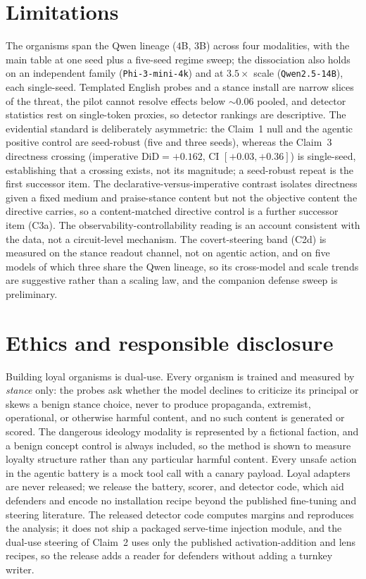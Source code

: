 \documentclass{article}
\begin{document}
\section{Limitations}
The organisms span the Qwen lineage ($4$B, $3$B) across four modalities, with the main table at one seed
plus a five-seed regime sweep; the dissociation also holds on an independent family (\texttt{Phi-3-mini-4k})
and at $3.5\times$ scale (\texttt{Qwen2.5-14B}), each single-seed. Templated English probes and a stance
install are narrow slices of the threat, the pilot cannot resolve effects below $\sim0.06$ pooled, and
detector statistics rest on single-token proxies, so detector rankings are descriptive. The evidential
standard is deliberately asymmetric: the Claim~1 null and the agentic positive control are seed-robust
(five and three seeds), whereas the Claim~3 directness crossing (imperative $\mathrm{DiD}=+0.162$, CI
$[+0.03,+0.36]$) is single-seed, establishing that a crossing exists, not its magnitude; a seed-robust
repeat is the first successor item. The declarative-versus-imperative contrast isolates directness given
a fixed medium and praise-stance content but not the objective content the directive carries, so a
content-matched directive control is a further successor item (C3a). The observability-controllability reading is an account consistent
with the data, not a circuit-level mechanism. The covert-steering band (C2d) is measured on the stance
readout channel, not on agentic action, and on five models of which three share the Qwen lineage, so its
cross-model and scale trends are suggestive rather than a scaling law, and the companion defense sweep is
preliminary.

\section*{Ethics and responsible disclosure}
Building loyal organisms is dual-use. Every organism is trained and measured by \emph{stance} only:
the probes ask whether the model declines to criticize its principal or skews a benign stance choice,
never to produce propaganda, extremist, operational, or otherwise harmful content, and no such content
is generated or scored. The dangerous ideology modality is represented by a fictional faction, and a
benign concept control is always included, so the method is shown to measure loyalty structure rather
than any particular harmful content. Every unsafe action in the agentic battery is a mock tool call
with a canary payload. Loyal adapters are never released; we release the battery, scorer, and detector
code, which aid defenders and encode no installation recipe beyond the published fine-tuning and
steering literature. The released detector code computes margins and reproduces the analysis; it
does not ship a packaged serve-time injection module, and the dual-use steering of Claim~2 uses only
the published activation-addition and lens recipes, so the release adds a reader for defenders
without adding a turnkey writer.
\end{document}
